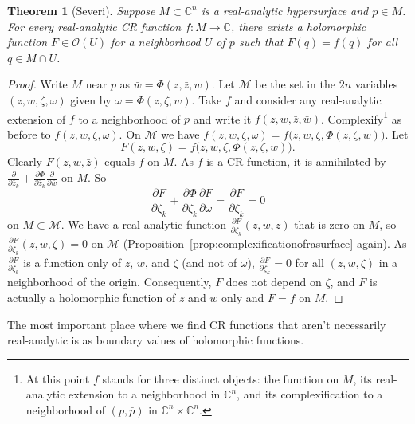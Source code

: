 \documentclass[12pt,openany]{book}
\newcommand{\C}{{\mathbb{C}}}
\newcommand{\sM}{{\mathscr{M}}}
\newcommand{\sO}{{\mathscr{O}}}
\theoremstyle{plain}
\newtheorem{thm}{Theorem}[section]
\theoremstyle{remark}
\theoremstyle{definition}
\theoremstyle{exercise}
\theoremstyle{example}
\newcommand{\propref}[1]{\hyperref[#1]{Proposition~\ref*{#1}}}
\begin{document}
\begin{thm}[Severi] \label{thm:severi}
Suppose $M \subset \C^n$ is a real-analytic hypersurface and $p \in M$.
For every real-analytic CR function $f \colon M \to \C$, there exists
a holomorphic function $F \in \sO(U)$ for a neighborhood $U$ of $p$
such that $F(q) = f(q)$ for all $q \in M \cap U$.
\end{thm}

\begin{proof}
Write $M$ near $p$ as $\bar{w} = \Phi(z,\bar{z},w)$.
Let $\sM$ be the set in the $2n$ variables $(z,w,\zeta,\omega)$ given by
$\omega = \Phi(z,\zeta,w)$.
Take $f$ and consider any real-analytic extension of $f$
to a neighborhood of $p$ and write it
$f(z,w,\bar{z},\bar{w})$.  Complexify\footnote{At this point
$f$ stands for three distinct objects:
the function on $M$, its real-analytic extension to
a neighborhood in $\C^n$, and its complexification
to a neighborhood of $(p,\bar{p})$ in $\C^n \times \C^n$.}
as before to
$f(z,w,\zeta,\omega)$.  On $\sM$ we have
$f(z,w,\zeta,\omega) = f\bigl(z,w,\zeta,\Phi(z,\zeta,w)\bigr)$.  Let
\begin{equation*}
F(z,w,\zeta) = f\bigl(z,w,\zeta,\Phi(z,\zeta,w)\bigr).
\end{equation*}
Clearly $F(z,w,\bar{z})$ equals $f$ on $M$.
As $f$ is a CR function, it is annihilated by
$\frac{\partial}{\partial \bar{z}_k}
+\frac{\partial \Phi}{\partial \bar{z}_k} \frac{\partial}{\partial
\bar{w}}$ on $M$.  So
\begin{equation*}
\frac{\partial F}{\partial \zeta_k}
+\frac{\partial \Phi}{\partial \zeta_k} \frac{\partial F}{\partial
\omega}
=
\frac{\partial F}{\partial \zeta_k} = 0
\end{equation*}
on $M \subset \sM$.  We have a real analytic function
$\frac{\partial F}{\partial \zeta_k}(z,w,\bar{z})$
that is zero on $M$, so
$\frac{\partial F}{\partial \zeta_k}(z,w,\zeta) = 0$
on $\sM$
(\propref{prop:complexificationofrasurface} again).
As $\frac{\partial F}{\partial \zeta_k}$ is a function only of
$z$, $w$, and $\zeta$ (and not of $\omega$),
$\frac{\partial F}{\partial \zeta_k} = 0$
for all
$(z,w,\zeta)$ in a neighborhood of the origin.  Consequently,
$F$ does not depend on $\zeta$, and
$F$ is actually a holomorphic function of $z$ and $w$ only
and $F = f$ on $M$.
\end{proof}

The most important place where we find CR functions that aren't necessarily
real-analytic is as boundary values of holomorphic functions.
\end{document}
